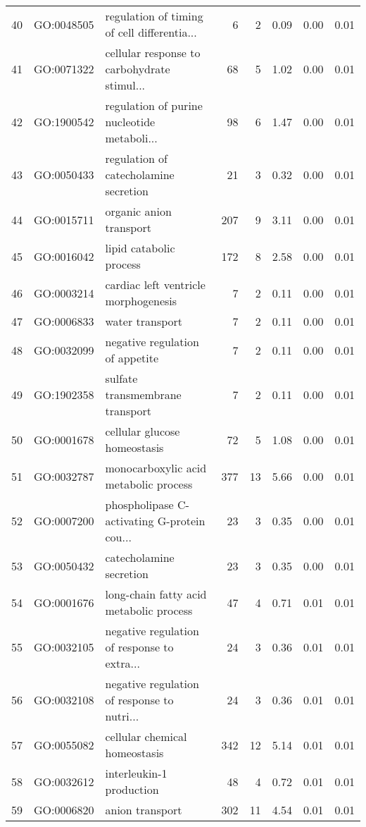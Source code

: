\begin{table}[ht]
\begin{tabular}{rllrrrrr}
  40 & GO:0048505 & regulation of timing of cell differentia... &   6 &   2 & 0.09 & 0.00 & 0.01 \\ 
  41 & GO:0071322 & cellular response to carbohydrate stimul... &  68 &   5 & 1.02 & 0.00 & 0.01 \\ 
  42 & GO:1900542 & regulation of purine nucleotide metaboli... &  98 &   6 & 1.47 & 0.00 & 0.01 \\ 
  43 & GO:0050433 & regulation of catecholamine secretion &  21 &   3 & 0.32 & 0.00 & 0.01 \\ 
  44 & GO:0015711 & organic anion transport & 207 &   9 & 3.11 & 0.00 & 0.01 \\ 
  45 & GO:0016042 & lipid catabolic process & 172 &   8 & 2.58 & 0.00 & 0.01 \\ 
  46 & GO:0003214 & cardiac left ventricle morphogenesis &   7 &   2 & 0.11 & 0.00 & 0.01 \\ 
  47 & GO:0006833 & water transport &   7 &   2 & 0.11 & 0.00 & 0.01 \\ 
  48 & GO:0032099 & negative regulation of appetite &   7 &   2 & 0.11 & 0.00 & 0.01 \\ 
  49 & GO:1902358 & sulfate transmembrane transport &   7 &   2 & 0.11 & 0.00 & 0.01 \\ 
  50 & GO:0001678 & cellular glucose homeostasis &  72 &   5 & 1.08 & 0.00 & 0.01 \\ 
  51 & GO:0032787 & monocarboxylic acid metabolic process & 377 &  13 & 5.66 & 0.00 & 0.01 \\ 
  52 & GO:0007200 & phospholipase C-activating G-protein cou... &  23 &   3 & 0.35 & 0.00 & 0.01 \\ 
  53 & GO:0050432 & catecholamine secretion &  23 &   3 & 0.35 & 0.00 & 0.01 \\ 
  54 & GO:0001676 & long-chain fatty acid metabolic process &  47 &   4 & 0.71 & 0.01 & 0.01 \\ 
  55 & GO:0032105 & negative regulation of response to extra... &  24 &   3 & 0.36 & 0.01 & 0.01 \\ 
  56 & GO:0032108 & negative regulation of response to nutri... &  24 &   3 & 0.36 & 0.01 & 0.01 \\ 
  57 & GO:0055082 & cellular chemical homeostasis & 342 &  12 & 5.14 & 0.01 & 0.01 \\ 
  58 & GO:0032612 & interleukin-1 production &  48 &   4 & 0.72 & 0.01 & 0.01 \\ 
  59 & GO:0006820 & anion transport & 302 &  11 & 4.54 & 0.01 & 0.01 \\ 

\end{tabular}
\end{table}
